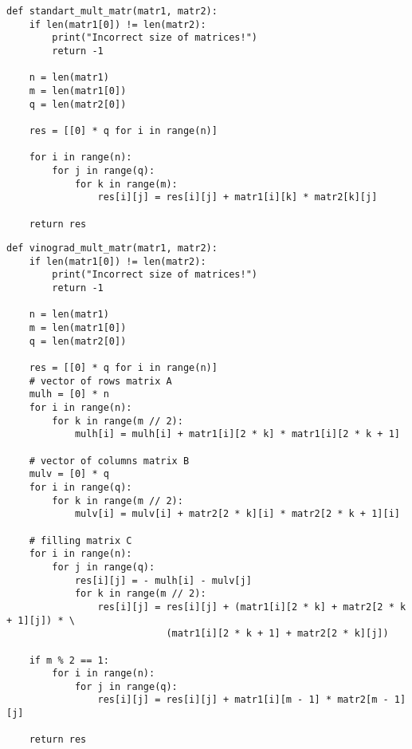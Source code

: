 \captionsetup{singlelinecheck = false, justification=raggedright}
\begin{lstlisting}[caption=Реализация стандартного алгоритма умножения матриц, 
    label={stand_mult}]
def standart_mult_matr(matr1, matr2):
    if len(matr1[0]) != len(matr2):
        print("Incorrect size of matrices!")
        return -1

    n = len(matr1)
    m = len(matr1[0])
    q = len(matr2[0])

    res = [[0] * q for i in range(n)]

    for i in range(n):
        for j in range(q):
            for k in range(m):
                res[i][j] = res[i][j] + matr1[i][k] * matr2[k][j]

    return res
\end{lstlisting}

\captionsetup{singlelinecheck = false, justification=raggedright}
\begin{lstlisting}[caption=Реализация алгоритма Винограда умножения матриц,
    label={vinograd_mult}]
def vinograd_mult_matr(matr1, matr2):
    if len(matr1[0]) != len(matr2):
        print("Incorrect size of matrices!")
        return -1

    n = len(matr1)
    m = len(matr1[0])
    q = len(matr2[0])

    res = [[0] * q for i in range(n)]
    # vector of rows matrix A
    mulh = [0] * n
    for i in range(n):
        for k in range(m // 2):
            mulh[i] = mulh[i] + matr1[i][2 * k] * matr1[i][2 * k + 1]

    # vector of columns matrix B
    mulv = [0] * q
    for i in range(q):
        for k in range(m // 2):
            mulv[i] = mulv[i] + matr2[2 * k][i] * matr2[2 * k + 1][i]

    # filling matrix C
    for i in range(n):
        for j in range(q):
            res[i][j] = - mulh[i] - mulv[j]
            for k in range(m // 2):
                res[i][j] = res[i][j] + (matr1[i][2 * k] + matr2[2 * k + 1][j]) * \
                            (matr1[i][2 * k + 1] + matr2[2 * k][j])

    if m % 2 == 1:
        for i in range(n):
            for j in range(q):
                res[i][j] = res[i][j] + matr1[i][m - 1] * matr2[m - 1][j]

    return res
\end{lstlisting}

